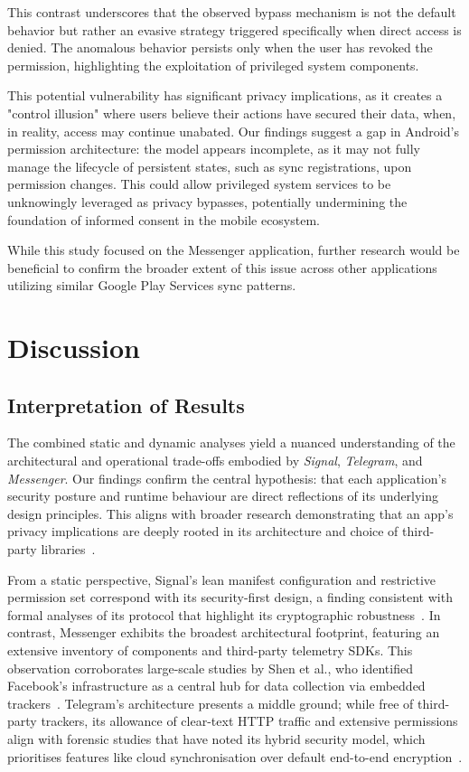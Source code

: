 \documentclass[a4paper,12pt]{report}
\begin{document}
This contrast underscores that the observed bypass mechanism is not the default behavior but rather an evasive strategy triggered specifically when direct access is denied. The anomalous behavior persists only when the user has revoked the permission, highlighting the exploitation of privileged system components.

This potential vulnerability has significant privacy implications, as it creates a "control illusion" where users believe their actions have secured their data, when, in reality, access may continue unabated. Our findings suggest a gap in Android's permission architecture: the model appears incomplete, as it may not fully manage the lifecycle of persistent states, such as sync registrations, upon permission changes. This could allow privileged system services to be unknowingly leveraged as privacy bypasses, potentially undermining the foundation of informed consent in the mobile ecosystem.

While this study focused on the Messenger application, further research would be beneficial to confirm the broader extent of this issue across other applications utilizing similar Google Play Services sync patterns.

\chapter{Discussion}

\section{Interpretation of Results}

The combined static and dynamic analyses yield a nuanced understanding of the architectural and operational trade-offs embodied by \textit{Signal}, \textit{Telegram}, and \textit{Messenger}. Our findings confirm the central hypothesis: that each application's security posture and runtime behaviour are direct reflections of its underlying design principles. This aligns with broader research demonstrating that an app's privacy implications are deeply rooted in its architecture and choice of third-party libraries~\cite{ShenVervierStringhini2021}.

From a static perspective, Signal’s lean manifest configuration and restrictive permission set correspond with its security-first design, a finding consistent with formal analyses of its protocol that highlight its cryptographic robustness~\cite{CohnGordon2017SignalAnalysis}. In contrast, Messenger exhibits the broadest architectural footprint, featuring an extensive inventory of components and third-party telemetry SDKs. This observation corroborates large-scale studies by Shen et al., who identified Facebook's infrastructure as a central hub for data collection via embedded trackers~\cite{ShenVervierStringhini2021}. Telegram's architecture presents a middle ground; while free of third-party trackers, its allowance of clear-text HTTP traffic and extensive permissions align with forensic studies that have noted its hybrid security model, which prioritises features like cloud synchronisation over default end-to-end encryption~\cite{moltchanov2018telegram}.
\end{document}
